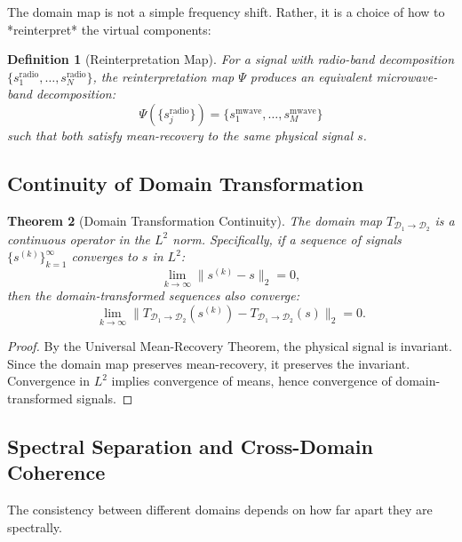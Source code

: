 \documentclass[twocolumn,11pt,a4paper]{article}
\newtheorem{theorem}{Theorem}[section]
\newtheorem{definition}[theorem]{Definition}
\newcommand{\signal}{s}
\newcommand{\domain}{\mathcal{D}}
\begin{document}
The domain map is not a simple frequency shift. Rather, it is a choice of how to *reinterpret* the virtual components:

\begin{definition}[Reinterpretation Map]
For a signal with radio-band decomposition $\{\signal_1^{\text{radio}}, \ldots, \signal_N^{\text{radio}}\}$, the \emph{reinterpretation map} $\Psi$ produces an equivalent microwave-band decomposition:
\begin{equation}
  \Psi(\{\signal_j^{\text{radio}}\}) = \{\signal_1^{\text{mwave}}, \ldots, \signal_M^{\text{mwave}}\}
\end{equation}
such that both satisfy mean-recovery to the same physical signal $\signal$.
\end{definition}

\subsection{Continuity of Domain Transformation}

\begin{theorem}[Domain Transformation Continuity]
The domain map $T_{\domain_1 \to \domain_2}$ is a continuous operator in the $L^2$ norm. Specifically, if a sequence of signals $\{\signal^{(k)}\}_{k=1}^\infty$ converges to $\signal$ in $L^2$:
\begin{equation}
  \lim_{k \to \infty} \| \signal^{(k)} - \signal \|_2 = 0,
\end{equation}
then the domain-transformed sequences also converge:
\begin{equation}
  \lim_{k \to \infty} \| T_{\domain_1 \to \domain_2}(\signal^{(k)}) - T_{\domain_1 \to \domain_2}(\signal) \|_2 = 0.
\end{equation}
\end{theorem}

\begin{proof}
By the Universal Mean-Recovery Theorem, the physical signal is invariant. Since the domain map preserves mean-recovery, it preserves the invariant. Convergence in $L^2$ implies convergence of means, hence convergence of domain-transformed signals.
\end{proof}

\subsection{Spectral Separation and Cross-Domain Coherence}

The consistency between different domains depends on how far apart they are spectrally.
\end{document}
